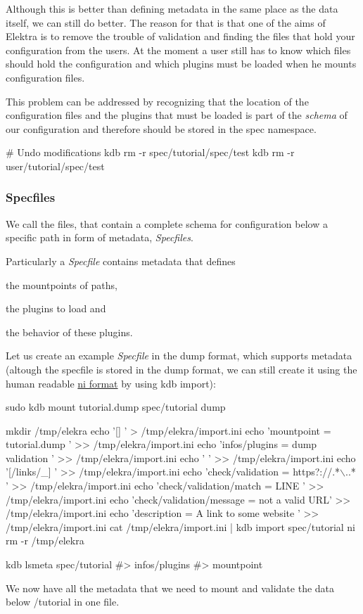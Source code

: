 Although this is better than defining metadata in the same place as the data itself, we can still do better. The reason for that is that one of the aims of Elektra is to remove the trouble of validation and finding the files that hold your configuration from the users. At the moment a user still has to know which files should hold the configuration and which plugins must be loaded when he mounts configuration files.

This problem can be addressed by recognizing that the location of the configuration files and the plugins that must be loaded is part of the {\itshape schema} of our configuration and therefore should be stored in the spec namespace.


\begin{DoxyCode}
# Undo modifications
kdb rm -r spec/tutorial/spec/test
kdb rm -r user/tutorial/spec/test
\end{DoxyCode}


\subsubsection*{Specfiles}

We call the files, that contain a complete schema for configuration below a specific path in form of metadata, {\itshape Specfiles}.

Particularly a {\itshape Specfile} contains metadata that defines
\begin{DoxyItemize}
\item the mountpoints of paths,
\item the plugins to load and
\item the behavior of these plugins.
\end{DoxyItemize}

Let us create an example {\itshape Specfile} in the dump format, which supports metadata (altough the specfile is stored in the dump format, we can still create it using the human readable \hyperlink{md_src_plugins_ni_README_src_plugins_ni_README_md}{ni format} by using {\ttfamily kdb import})\+: 
\begin{DoxyCode}
sudo kdb mount tutorial.dump spec/tutorial dump

mkdir /tmp/elekra
echo '[]                                        ' >  /tmp/elekra/import.ini
echo 'mountpoint = tutorial.dump                ' >> /tmp/elekra/import.ini
echo 'infos/plugins = dump validation           ' >> /tmp/elekra/import.ini
echo '                                          ' >> /tmp/elekra/import.ini
echo '[/links/\_]                                ' >> /tmp/elekra/import.ini
echo 'check/validation = https?://.*\(\backslash\)..*        ' >> /tmp/elekra/import.ini
echo 'check/validation/match = LINE             ' >> /tmp/elekra/import.ini
echo 'check/validation/message = not a valid URL' >> /tmp/elekra/import.ini
echo 'description = A link to some website      ' >> /tmp/elekra/import.ini
cat /tmp/elekra/import.ini | kdb import spec/tutorial ni
rm -r /tmp/elekra

kdb lsmeta spec/tutorial
#> infos/plugins
#> mountpoint
\end{DoxyCode}
 We now have all the metadata that we need to mount and validate the data below {\ttfamily /tutorial} in one file.

